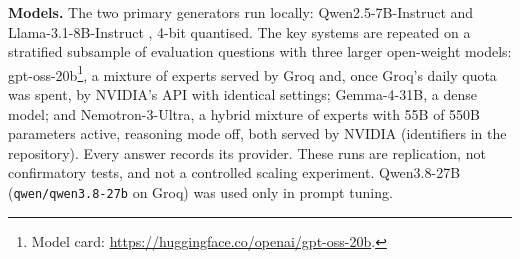 \textbf{Models.} The two primary generators run locally: Qwen2.5-7B-Instruct \cite{qwen2024qwen25} and Llama-3.1-8B-Instruct \cite{grattafiori2024llama3}, 4-bit quantised. The key systems are repeated on a stratified subsample of \nHostedQ{} evaluation questions with three larger open-weight models: gpt-oss-20b\footnote{Model card: \url{https://huggingface.co/openai/gpt-oss-20b}.}, a mixture of experts served by Groq and, once Groq's daily quota was spent, by NVIDIA's API with identical settings; Gemma-4-31B, a dense model; and Nemotron-3-Ultra, a hybrid mixture of experts with 55B of 550B parameters active, reasoning mode off, both served by NVIDIA (identifiers in the repository). Every answer records its provider. These runs are replication, not confirmatory tests, and not a controlled scaling experiment. Qwen3.8-27B (\texttt{qwen/qwen3.8-27b} on Groq) was used only in prompt tuning.

